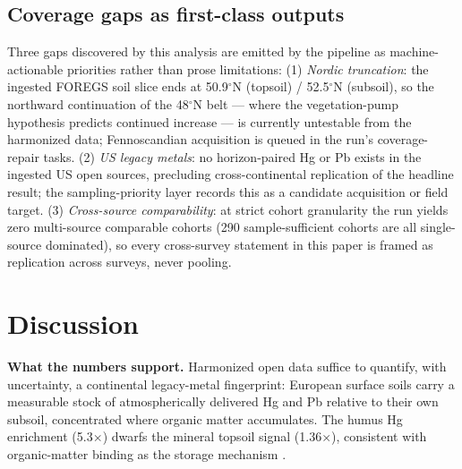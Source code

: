 \documentclass[11pt]{article}
\begin{document}
\subsection{Coverage gaps as first-class outputs}
\label{sec:gaps}
Three gaps discovered by this analysis are emitted by the pipeline as
machine-actionable priorities rather than prose limitations:
(1) \emph{Nordic truncation}: the ingested FOREGS soil slice ends at
50.9$^{\circ}$N (topsoil) / 52.5$^{\circ}$N (subsoil), so the northward
continuation of the 48$^{\circ}$N belt --- where the vegetation-pump
hypothesis predicts continued increase \cite{ballabio2021} --- is currently
untestable from the harmonized data; Fennoscandian acquisition is queued in
the run's coverage-repair tasks.
(2) \emph{US legacy metals}: no horizon-paired Hg or Pb exists in the ingested
US open sources, precluding cross-continental replication of the headline
result; the sampling-priority layer records this as a candidate acquisition
or field target.
(3) \emph{Cross-source comparability}: at strict cohort granularity the run
yields zero multi-source comparable cohorts (290 sample-sufficient cohorts are
all single-source dominated), so every cross-survey statement in this paper is
framed as replication across surveys, never pooling.

\section{Discussion}

\textbf{What the numbers support.} Harmonized open data suffice to quantify,
with uncertainty, a continental legacy-metal fingerprint: European surface
soils carry a measurable stock of atmospherically delivered Hg and Pb
relative to their own subsoil, concentrated where organic matter accumulates.
The humus Hg enrichment (5.3$\times$) dwarfs the mineral topsoil signal
(1.36$\times$), consistent with organic-matter binding as the storage
mechanism \cite{obrist2017,jiskra2018}.
\end{document}
